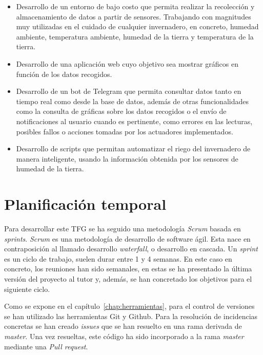\documentclass[a4paper, 12pt, oneside]{book}
\begin{document}
\begin{itemize}
\item Desarrollo de un entorno de bajo costo que permita realizar la recolección y almacenamiento de datos a partir de sensores. Trabajando con magnitudes muy utilizadas en el cuidado de cualquier invernadero, en concreto, humedad ambiente, temperatura ambiente, humedad de la tierra y temperatura de la tierra.

\item Desarrollo de una aplicación web cuyo objetivo sea mostrar gráficos en función de los datos recogidos.

\item Desarrollo de un bot de Telegram que permita consultar datos tanto en tiempo real como desde la base de datos, además de otras funcionalidades como la consulta de gráficas sobre los datos recogidos o el envío de notificaciones al usuario cuando es pertinente, como errores en las lecturas, posibles fallos o acciones tomadas por los actuadores implementados.

\item Desarrollo de scripts que permitan automatizar el riego del invernadero de manera inteligente, usando la información obtenida por los sensores de humedad de la tierra. 
\end{itemize}

\section{Planificación temporal}
\label{sec:Metodología}
Para desarrollar este TFG se ha seguido una metodología \textit{Scrum} basada en \textit{sprints}.
\textit{Scrum} es una metodología de desarrollo de software ágil. Esta nace en contraposición al llamado desarrollo \textit{waterfall}, o desarrollo en cascada. Un \textit{sprint} es un ciclo de trabajo, suelen durar entre 1 y 4 semanas.
En este caso en concreto, los reuniones han sido semanales, en estas se ha presentado la última versión del proyecto al tutor y, además, se han concretado los objetivos para el siguiente ciclo.

Como se expone en el capítulo~\ref{chap:herramientas}, para el control de versiones se han utilizado las herramientas Git y Github. Para la resolución de incidencias concretas se han creado \textit{issues} que se han resuelto en una rama derivada de \textit{master}. Una vez resueltas, este código ha sido incorporado a la rama \textit{master} mediante una \textit{Pull request}.
\end{document}
